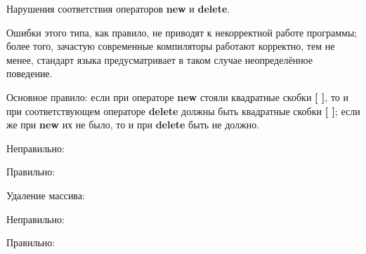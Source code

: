 \begin{typerror}
	\label{TE_delete-brackets}
	Нарушения соответствия операторов \textbf{new} и \textbf{delete}.

	Ошибки этого типа, как правило, не приводят к некорректной работе программы;
	более того, зачастую современные компиляторы работают корректно, тем не менее, стандарт языка предусматривает в таком случае неопределённое поведение.

	Основное правило:
	если при операторе \textbf{new} стояли квадратные скобки \textbf{[ ]}, то и при соответствующем операторе \textbf{delete} должны быть квадратные скобки \textbf{[ ]};
	если же при \textbf{new} их не было, то и при \textbf{delete} быть не должно.

	Неправильно:

	Правильно:

	Удаление массива:

	Неправильно:

	Правильно:
	
\end{typerror}
